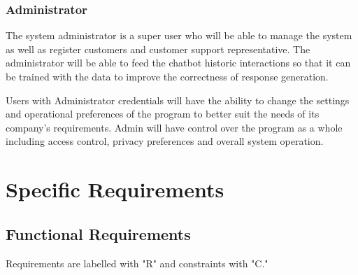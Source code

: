 \documentclass[11pt]{article}
\begin{document}
\subsubsection{Administrator}
The system administrator is a super user who will be able to manage the system as well as register customers and customer support representative. The administrator will be able to feed the chatbot historic interactions so that it can be trained with the data to improve the correctness of response generation.

Users with Administrator credentials will have the ability to change the settings and operational preferences of the program to better suit the needs of its company's requirements. Admin will have control over the program as a whole including access control, privacy preferences and overall system operation.


\section{Specific Requirements}

\subsection{Functional Requirements} %

Requirements are labelled with "R" and constraints with "C."
	
\end{document}
